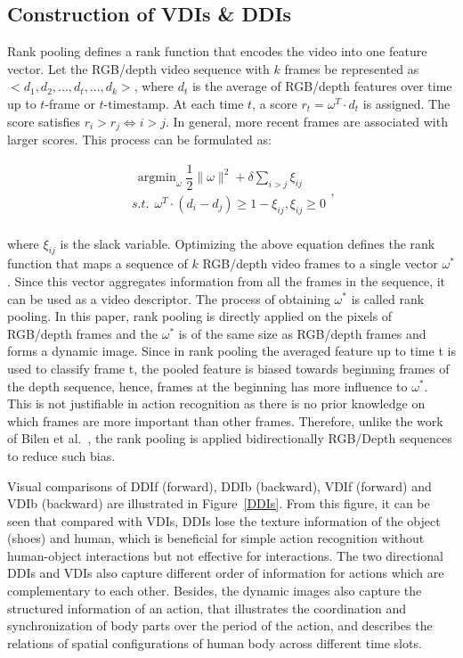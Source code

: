 \documentclass[letterpaper]{article} %
\begin{document}
\subsection{Construction of VDIs \& DDIs}

Rank pooling defines a rank function that encodes the video into one feature vector. Let the RGB/depth video sequence with $k$ frames be represented as  $<d_{1},d_{2},...,d_{t},...,d_{k}>$, where $d_{t}$ is the average of RGB/depth features over time up to $t$-frame or $t$-timestamp.  At each time $t$, a score $r_{t} = \omega^{T}\cdot d_{t}$ is assigned. The score satisfies $r_{i} > r_{j} \Longleftrightarrow i > j$. In general, more recent frames are associated with larger scores.  This process can be formulated as:

\begin{equation}
\begin{aligned}
\ \mathop{\arg\min}_{\omega} \dfrac{1}{2}\parallel \omega \parallel^{2} + \delta \sum\limits_{i > j} \xi_{ij}\\ s.t.~~ \omega^{T}\cdot(d_{i}-d_{j})\geq 1 -\xi_{ij}, \xi_{ij} \geq 0\\
\end{aligned},
\end{equation}

where $\xi_{ij}$ is the slack variable. Optimizing the above equation defines the rank function that maps a sequence of $k$ RGB/depth video frames to a single vector $\omega^{*}$. Since this vector aggregates information from all the frames in the sequence, it can be used as a video descriptor. The process of obtaining $\omega^{*}$ is called rank pooling. In this paper, rank pooling is directly applied on the pixels of RGB/depth frames and the $\omega^{*}$ is of the same size as RGB/depth frames and forms a dynamic image. Since in rank pooling the averaged feature up to time t is used to classify frame t, the pooled feature is biased towards beginning frames of the depth sequence, hence, frames at the beginning has more influence to $\omega^{*}$. This is not justifiable in action recognition as there is no prior knowledge on which frames are more important than other frames. Therefore, unlike the work of Bilen et al.~\cite{bilen2016dynamic}, the rank pooling is applied bidirectionally RGB/Depth sequences to reduce such bias.

Visual comparisons of DDIf (forward), DDIb (backward), VDIf (forward) and VDIb (backward) are illustrated in Figure~\ref{DDIs}. From this figure, it can be seen that compared with VDIs,  DDIs lose the texture information of the object (shoes) and human, which is beneficial for simple action recognition without human-object interactions but not effective for interactions. The two directional DDIs and VDIs also capture different order of information for actions which are complementary to each other. Besides, the dynamic images also capture the structured information of an action, that  illustrates the coordination and synchronization of body parts over the period of the action, and describes the relations of spatial configurations of human body across different time slots.
\end{document}
